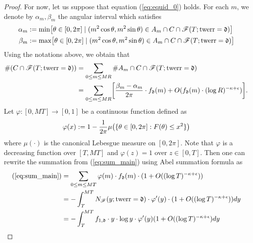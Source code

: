 \documentclass[12pt]{amsart}
\numberwithin{equation}{section} %
\theoremstyle{definition} \newtheorem{definition}[counter]{Definition}
\theoremstyle{remark} \newtheorem{nonexam}[counter]{Non-example}
\newcommand{\FF}{\mathscr{F}} %
\let\originalleft\left \let\originalright\right
\renewcommand{\left}{\mathopen{}\mathclose\bgroup\originalleft}
\renewcommand{\right}{\aftergroup\egroup\originalright}
\DeclareMathOperator{\twerr}{twerr} %
\begin{document}
\begin{proof}
    For now, let us suppose that equation (\ref{eq:equid_0}) holds. For each $m$, we denote by $\alpha_m, \beta_m$ the angular interval which satisfies
    \begin{align}
        \begin{split}
            \alpha_m &:= \min\left[ \theta \in [0,2\pi] \; | \; (m^2 \cos \theta, m^2 \sin \theta) \in A_m \cap C \cap \FF(T; \twerr = \mathfrak{d}) \right] \\
            \beta_m &:= \max\left[ \theta \in [0,2\pi] \; | \; (m^2 \cos \theta, m^2 \sin \theta) \in A_m \cap C \cap \FF(T; \twerr = \mathfrak{d}) \right] 
        \end{split}
    \end{align} 
    Using the notations above, we obtain that
    \begin{align} \label{eq:sum_main}
    \begin{split}
        \#(C \cap \FF(T; \twerr = \mathfrak{d})) &= \sum_{0 \leq m \leq M R} \# A_m \cap C \cap \FF(T; \twerr = \mathfrak{d}) \\
        &= \sum_{0 \leq m \leq M R} \left[\frac{\beta_m - \alpha_m}{2\pi} \cdot f_\mathfrak{d}(m) + O(f_\mathfrak{d}(m) \cdot (\log R)^{-\kappa + \epsilon}) \right].
    \end{split}
    \end{align}
    Let $\varphi: [0,MT] \to [0,1]$ be a continuous function defined as
    \begin{equation*}
        \varphi(x) := 1 - \frac{1}{2\pi} \mu \left(\{ \theta \in [0,2\pi] : F(\theta) \leq x^2 \} \right)
    \end{equation*}
    where $\mu(\cdot)$ is the canonical Lebesgue measure on $[0,2\pi]$. Note that $\varphi$ is a decreasing function over $[T,MT]$ and $\varphi(z) = 1$ over $z \in [0,T]$.
    Then one can rewrite the summation from (\ref{eq:sum_main}) using Abel summation formula as
    \begin{align}
        \begin{split}
            (\ref{eq:sum_main}) &= \sum_{0 \leq m \leq MT} \varphi(m) \cdot f_\mathfrak{d}(m) \cdot (1 + O((\log T)^{- \kappa + \epsilon})) \\
            &= - \int_{T}^{MT} N_{\FF}(y; \twerr = \mathfrak{d}) \cdot \varphi'(y) \cdot (1 + O((\log T)^{- \kappa + \epsilon})) dy \\
            &= -\int_T^{MT} f_{1,\mathfrak{d}} \cdot y \cdot \log y \cdot \varphi'(y) (1 + O((\log T)^{- \kappa + \epsilon}) dy
        \end{split}

\end{align}
\end{proof}
\end{document}
